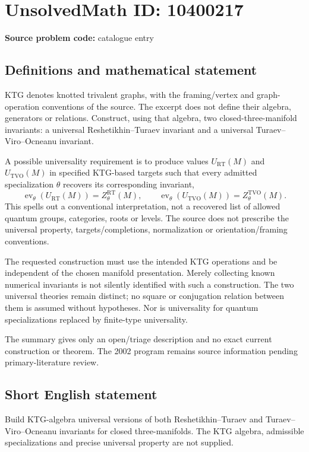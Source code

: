 \documentclass[11pt]{article}
\begin{document}
\section*{UnsolvedMath ID: 10400217}
\textbf{Source problem code:} catalogue entry
\subsection{Definitions and mathematical statement}
KTG denotes knotted trivalent graphs, with the framing/vertex and graph-operation conventions of the source. The excerpt does not define their algebra, generators or relations. Construct, using that algebra, two closed-three-manifold invariants: a universal Reshetikhin--Turaev invariant and a universal Turaev--Viro--Ocneanu invariant.

A possible universality requirement is to produce values \(U_{\mathrm{RT}}(M)\) and \(U_{\mathrm{TVO}}(M)\) in specified KTG-based targets such that every admitted specialization \(\theta\) recovers its corresponding invariant,
\[
 \operatorname{ev}_\theta(U_{\mathrm{RT}}(M))=Z^{\mathrm{RT}}_\theta(M),
 \qquad
 \operatorname{ev}_\theta(U_{\mathrm{TVO}}(M))=Z^{\mathrm{TVO}}_\theta(M).
\]
This spells out a conventional interpretation, not a recovered list of allowed quantum groups, categories, roots or levels. The source does not prescribe the universal property, targets/completions, normalization or orientation/framing conventions.

The requested construction must use the intended KTG operations and be independent of the chosen manifold presentation. Merely collecting known numerical invariants is not silently identified with such a construction. The two universal theories remain distinct; no square or conjugation relation between them is assumed without hypotheses. Nor is universality for quantum specializations replaced by finite-type universality.

The summary gives only an open/triage description and no exact current construction or theorem. The 2002 program remains source information pending primary-literature review.
\subsection{Short English statement}
Build KTG-algebra universal versions of both Reshetikhin--Turaev and Turaev--Viro--Ocneanu invariants for closed three-manifolds. The KTG algebra, admissible specializations and precise universal property are not supplied.
\end{document}
